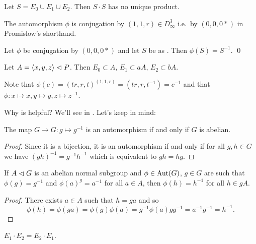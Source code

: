 \begin{theorem}[Promislow]
    \label{theorem:S_duplex}
    Let $S = E_0 \cup E_1 \cup E_2$.
    Then $S \cdot S$ has no unique product.
\end{theorem}

The automorphism $\phi$ is conjugation by $(1, 1, r) \in D_\infty^3$ i.e.\ by $(0, 0, 0*)$ in Promislow's shorthand.

\begin{lemma}
    \label{lemma:S_symmetry}
    Let $\phi$ be conjugation by $(0, 0, 0*)$ and let $S$ be as .
    Then $\phi(S) = S^{-1}$.
    \qed
\end{lemma}

\begin{remark}
    Let $A = \langle x, y, z \rangle \vartriangleleft P$.
    Then $E_0 \subset A$, $E_1 \subset aA$, $E_2 \subset bA$.
\end{remark}

Note that $\phi(c) = (tr, r, t)^{(1, 1, r)} = (tr, r, t^{-1}) = c^{-1}$ and that $\phi \colon x \mapsto x, y \mapsto y, z \mapsto z^{-1}$.

Why is  helpful?
We'll see in .
Let's keep in mind:
\begin{lemma}
    The map $G \to G \colon g \mapsto g^{-1}$ is an automorphism if and only if $G$ is abelian.
\end{lemma}

\begin{proof}
    Since it is a bijection, it is an automorphism if and only if for all $g, h \in G$ we have $(gh)^{-1} = g^{-1} h^{-1}$ which is equivalent to $gh = hg$.
\end{proof}

\begin{lemma}
    \label{lemma:virtually_abelian_trick}
    If $A \vartriangleleft G$ is an abelian normal subgroup and $\phi \in \mathrm{Aut}(G)$, $g \in G$ are such that $\phi(g) = g^{-1}$ and $\phi(a)^g = a^{-1}$ for all $a \in A$, then $\phi(h) = h^{-1}$ for all $h \in gA$.
\end{lemma}

\begin{proof}
    There exists $a \in A$ such that $h = ga$ and so \[
        \phi(h) = \phi(ga) = \phi(g) \phi(a) = g^{-1} \phi(a) g g^{-1} = a^{-1} g^{-1} = h^{-1}.
    \]
\end{proof}

\begin{corollary}
    \label{corollary:promislow_freebie}
    $E_1 \cdot E_2 = E_2 \cdot E_1$.
\end{corollary}

